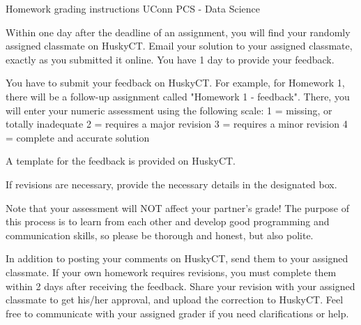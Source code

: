 Homework grading instructions
UConn PCS - Data Science

Within one day after the deadline of an assignment, you will find your randomly assigned classmate on HuskyCT.
Email your solution to your assigned classmate, exactly as you submitted it online.
You have 1 day to provide your feedback. 

You have to submit your feedback on HuskyCT. For example, for Homework 1, there will be a follow-up assignment called "Homework 1 - feedback". There, you will enter your numeric assessment using the following scale:
1 = missing, or totally inadequate
2 = requires a major revision
3 = requires a minor revision
4 = complete and accurate solution

A template for the feedback is provided on HuskyCT.

If revisions are necessary, provide the necessary details in the designated box.

Note that your assessment will NOT affect your partner's grade! The purpose of this process is to learn from each other and develop good programming and communication skills, so please be thorough and honest, but also polite.

In addition to posting your comments on HuskyCT, send them to your assigned classmate. If your own homework requires revisions, you must complete them within 2 days after receiving the feedback. Share your revision with your assigned classmate to get his/her approval, and upload the correction to HuskyCT. Feel free to communicate with your assigned grader if you need clarifications or help.

